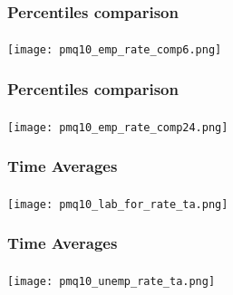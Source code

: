 \begin{frame}

    \label{perc_comparison_2}
    
    \frametitle{Percentiles comparison} %
    \framesubtitle{}  %
    \rmfamily %

    \begin{center}
        \texttt{[image: pmq10\_emp\_rate\_comp6.png]}
    \end{center}
    
    \hyperlink{emp_rate_result}{}
    
\end{frame}

\begin{frame}

    \label{perc_comparison_21}
    
    \frametitle{Percentiles comparison} %
    \framesubtitle{}  %
    \rmfamily %

    \begin{center}
        \texttt{[image: pmq10\_emp\_rate\_comp24.png]}
    \end{center}
    
    \hyperlink{emp_rate_result}{}
    
\end{frame}

\begin{frame}

    \label{ta_3}
    
    \frametitle{Time Averages} %
    \framesubtitle{}  %
    \rmfamily %

    \begin{center}
        \texttt{[image: pmq10\_lab\_for\_rate\_ta.png]}
    \end{center}
    
    \hyperlink{lab_force_rate_result}{}
    
\end{frame}

\begin{frame}

    \label{ta_1}
    
    \frametitle{Time Averages} %
    \framesubtitle{}  %
    \rmfamily %

    \begin{center}
        \texttt{[image: pmq10\_unemp\_rate\_ta.png]}
    \end{center}
    
    \hyperlink{unemp_rate_result}{}
    
\end{frame}

